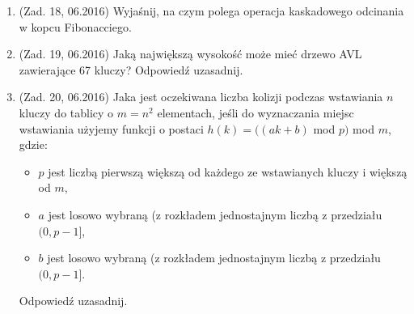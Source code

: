 \documentclass[10pt]{article}%
\begin{document}
\begin{enumerate}
\item (Zad. 18, 06.2016) Wyjaśnij, na czym polega operacja kaskadowego odcinania w kopcu Fibonacciego.
\item (Zad. 19, 06.2016) Jaką największą wysokość może mieć drzewo AVL zawierające 67 kluczy? Odpowiedź uzasadnij.
\item (Zad. 20, 06.2016) Jaka jest oczekiwana liczba kolizji podczas wstawiania $n$ kluczy do tablicy o $ m = n^2 $ elementach, jeśli do wyznaczania miejsc wstawiania użyjemy funkcji o postaci $h(k) = ((ak + b)$ mod $p)$ mod $m$, gdzie:
\begin{itemize}
\item $p$ jest liczbą pierwszą większą od każdego ze wstawianych kluczy i większą od $m$,
\item $a$ jest losowo wybraną (z rozkładem jednostajnym liczbą z przedziału $(0, p-1]$,
\item $b$ jest losowo wybraną (z rozkładem jednostajnym liczbą z przedziału $(0, p-1]$.
\end{itemize} 
Odpowiedź uzasadnij.
\end{enumerate}
\end{document}
